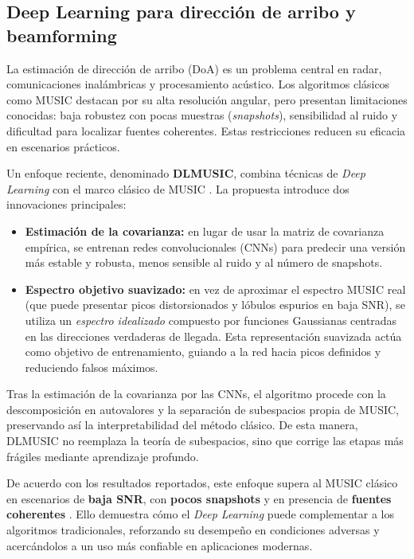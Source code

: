 \subsection{Deep Learning para dirección de arribo y beamforming}
\label{sec:dl_doa}

La estimación de dirección de arribo (DoA) es un problema central en radar, comunicaciones inalámbricas y procesamiento acústico.  
Los algoritmos clásicos como MUSIC destacan por su alta resolución angular, pero presentan limitaciones conocidas: baja robustez con pocas muestras (\emph{snapshots}), sensibilidad al ruido y dificultad para localizar fuentes coherentes.  
Estas restricciones reducen su eficacia en escenarios prácticos.

Un enfoque reciente, denominado \textbf{DLMUSIC}, combina técnicas de \emph{Deep Learning} con el marco clásico de MUSIC \cite{BaiChen2023_DLMUSIC}.  
La propuesta introduce dos innovaciones principales:
\begin{itemize}
	\item \textbf{Estimación de la covarianza:} en lugar de usar la matriz de covarianza empírica, se entrenan redes convolucionales (CNNs) para predecir una versión más estable y robusta, menos sensible al ruido y al número de snapshots.  
	\item \textbf{Espectro objetivo suavizado:} en vez de aproximar el espectro MUSIC real (que puede presentar picos distorsionados y lóbulos espurios en baja SNR), se utiliza un \emph{espectro idealizado} compuesto por funciones Gaussianas centradas en las direcciones verdaderas de llegada.  
	Esta representación suavizada actúa como objetivo de entrenamiento, guiando a la red hacia picos definidos y reduciendo falsos máximos.
\end{itemize}

Tras la estimación de la covarianza por las CNNs, el algoritmo procede con la descomposición en autovalores y la separación de subespacios propia de MUSIC, preservando así la interpretabilidad del método clásico.  
De esta manera, DLMUSIC no reemplaza la teoría de subespacios, sino que corrige las etapas más frágiles mediante aprendizaje profundo.

De acuerdo con los resultados reportados, este enfoque supera al MUSIC clásico en escenarios de \textbf{baja SNR}, con \textbf{pocos snapshots} y en presencia de \textbf{fuentes coherentes} \cite{BaiChen2023_DLMUSIC}.  
Ello demuestra cómo el \emph{Deep Learning} puede complementar a los algoritmos tradicionales, reforzando su desempeño en condiciones adversas y acercándolos a un uso más confiable en aplicaciones modernas.



